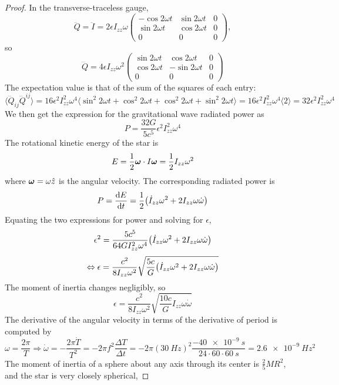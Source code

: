 \documentclass{article}
\begin{document}
\begin{proof}
  In the transverse-traceless gauge,
  \[
    \ddot{Q} = \ddot{I} = 2\epsilon I_{zz}\omega
    \begin{pmatrix}
      -\cos 2\omega t & \sin 2\omega t & 0 \\
      \sin 2\omega t & \cos 2\omega t & 0 \\
      0 & 0 & 0
    \end{pmatrix},
  \]
  so
  \[
    \dddot{Q} = 4\epsilon I_{zz}\omega^{2}
    \begin{pmatrix}
      \sin 2\omega t & \cos 2\omega t & 0 \\
      \cos 2\omega t & -\sin 2\omega t & 0 \\
      0 & 0 & 0
    \end{pmatrix}
  \]
  The expectation value is that of the sum of the squares of each entry:
  \[
    \langle \dddot{Q}_{ij}\dddot{Q}^{ij} \rangle
    = 16\epsilon^{2} I_{zz}^{2}\omega^{4}\langle \sin^{2}2\omega t + \cos^{2} 2\omega t + \cos^{2} 2\omega t + \sin^{2} 2\omega t \rangle
    = 16\epsilon^{2} I_{zz}^{2}\omega^{4}\langle 2 \rangle
    = 32\epsilon^{2} I_{zz}^{2}\omega^{4}
  \]
  We then get the expression for the gravitational wave radiated power as
  \[
    P = \frac{32G}{5c^{5}}\epsilon^{2}I_{zz}^{2}\omega^{4}
  \]
  The rotational kinetic energy of the star is
  \[
    E = \frac{1}{2}\vb*{\omega}\cdot {I}\vb*{\omega} = \frac{1}{2}I_{zz}\omega^{2}
  \]
  where $\vb*{\omega} = \omega\hat{z}$ is the angular velocity.
  The corresponding radiated power is
  \[
    P = \dv{E}{t} = \frac{1}{2}\qty(\dot{I}_{zz}\omega^{2} + 2I_{zz}\omega\dot{\omega})
  \]
  Equating the two expressions for power and solving for $\epsilon$,
  \[
    \epsilon^{2} = \frac{5c^{5}}{64GI_{zz}^{2}\omega^{4}}\qty(\dot{I}_{zz}\omega^{2} + 2I_{zz}\omega\dot{\omega})
  \]
  \[
    \Leftrightarrow \epsilon = \frac{c^{2}}{8I_{zz}\omega^{2}}\sqrt{\frac{5c}{G}\qty(\dot{I}_{zz}\omega^{2} + 2I_{zz}\omega\dot{\omega})}
  \]
  The moment of inertia changes negligibly, so
  \[
    \epsilon = \frac{c^{2}}{8I_{zz}\omega^{2}}\sqrt{\frac{10c}{G}I_{zz}\omega\dot{\omega}}
  \]
  The derivative of the angular velocity in terms of the derivative of period is computed by
  \[
    \omega = \frac{2\pi}{T} \Rightarrow \dot{\omega} = -\frac{2\pi\dot{T}}{T^{2}} = -2\pi f^{2}\frac{\Delta T}{\Delta t}
    = -2\pi(\SI{30}{Hz})^{2}\frac{\SI{-40e-9}{s}}{24\cdot 60 \cdot \SI{60}{s}}
    = \SI{2.6e-9}{Hz^{2}}
  \]
  The moment of inertia of a sphere about any axis through its center is $\frac{2}{5}MR^{2}$, and the star is very closely spherical,

\end{proof}
\end{document}
